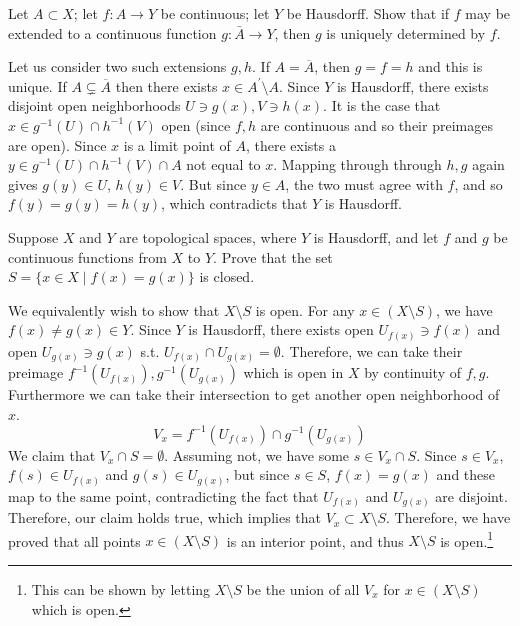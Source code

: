   \begin{exercise}[Munkres 18.13]
    Let $A \subset X$; let $f : A \to Y$ be continuous; let $Y$ be Hausdorff. Show that if $f$ may be extended to a continuous function $g : \bar{A} \to Y$, then $g$ is uniquely determined by $f$.
  \end{exercise}
  \begin{solution}
    Let us consider two such extensions $g, h$. If $A = \overline{A}$, then $g = f = h$ and this is unique. If $A \subsetneq \overline{A}$ then there exists $x \in A^\prime \setminus A$. Since $Y$ is Hausdorff, there exists disjoint open neighborhoods $U \ni g(x), V \ni h(x)$. It is the case that $x \in g^{-1}(U) \cap h^{-1} (V)$ open (since $f, h$ are continuous and so their preimages are open). Since $x$ is a limit point of $A$, there exists a $y \in g^{-1} (U) \cap h^{-1} (V) \cap A$ not equal to $x$. Mapping through through $h, g$ again gives $g(y) \in U$, $h(y) \in V$. But since $y \in A$, the two must agree with $f$, and so $f(y) = g(y) = h(y)$, which contradicts that $Y$ is Hausdorff. 
  \end{solution}

  \begin{exercise}
    Suppose $X$ and $Y$ are topological spaces, where $Y$ is Hausdorff, and let $f$ and $g$ be continuous functions from $X$ to $Y$. Prove that the set $S = \{x \in X \mid f(x) = g(x)\}$ is closed.
  \end{exercise}
  \begin{solution}
    We equivalently wish to show that $X \setminus S$ is open. For any $x \in (X \setminus S)$, we have $f(x) \neq g(x) \in Y$. Since $Y$ is Hausdorff, there exists open $U_{f(x)} \ni f(x)$ and open $U_{g(x)} \ni g(x)$ s.t. $U_{f(x)} \cap U_{g(x)} = \emptyset$. Therefore, we can take their preimage $f^{-1} (U_{f(x)}), g^{-1} (U_{g(x)})$ which is open in $X$ by continuity of $f, g$. Furthermore we can take their intersection to get another open neighborhood of $x$. 
    \begin{equation}
     V_x = f^{-1} (U_{f(x)}) \cap g^{-1} (U_{g(x)}) 
    \end{equation}
    We claim that $V_x \cap S = \emptyset$. Assuming not, we have some $s \in V_x \cap S$. Since $s \in V_x$, $f(s) \in U_{f(x)}$ and $g(s) \in U_{g(x)}$, but since $s \in S$, $f(x) = g(x)$ and these map to the same point, contradicting the fact that $U_{f(x)}$ and $U_{g(x)}$ are disjoint. Therefore, our claim holds true, which implies that $V_x \subset X \setminus S$. Therefore, we have proved that all points $x \in (X \setminus S)$ is an interior point, and thus $X \setminus S$ is open.\footnote{This can be shown by letting $X \setminus S$ be the union of all $V_x$ for $x \in (X \setminus S)$ which is open.}
  \end{solution}

